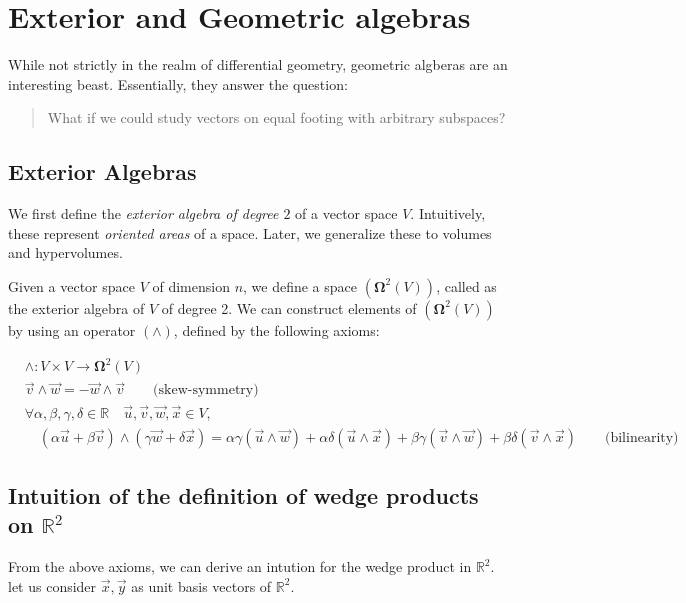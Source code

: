 \documentclass[11pt]{book}
\newcommand{\R}{\ensuremath{\mathbb R}}
\begin{document}
\chapter{Exterior and Geometric algebras}

While not strictly in the realm of differential geometry, geometric algberas
are an interesting beast. Essentially, they answer the question:

\begin{quote}
    What if we could study vectors on equal footing with arbitrary subspaces?
\end{quote}

\section{Exterior Algebras}
We first define the \emph{exterior algebra of degree $2$} of a vector space $V$.
Intuitively, these represent \emph{oriented areas} of a space. Later,
we generalize these to volumes and hypervolumes.

Given a vector space $V$ of dimension $n$, we define a space $(\mathbf \Omega^2(V))$, called
as the exterior algebra of $V$ of degree 2. We can construct 
elements of $(\mathbf \Omega^2(V))$
by using an operator $(\wedge)$, defined by the following axioms:

\begin{align*}
    &\wedge: V \times V \rightarrow \mathbf \Omega^2(V) \\
    &\vec v \wedge \vec w  = -\vec w \wedge \vec v \qquad \text{(skew-symmetry)}\\
    &\forall \alpha, \beta, \gamma, \delta \in \R \quad \vec u, \vec v,\vec w, \vec x \in V, \\
    &\quad (\alpha \vec u + \beta \vec v) \wedge (\gamma \vec w + \delta \vec x) = 
        \alpha \gamma (\vec u \wedge \vec w) + 
        \alpha \delta (\vec u \wedge \vec x) + 
        \beta \gamma  (\vec v \wedge \vec w) +
         \beta \delta  (\vec v \wedge \vec x) \qquad \text{(bilinearity)}
\end{align*}

\section{Intuition of the definition of wedge products on $\R^2$}

From the above axioms, we can derive an intution for the wedge product in
$\mathbb R^2$. let us consider $\vec x, \vec y$ as unit basis vectors of $\R^2$.
\end{document}
